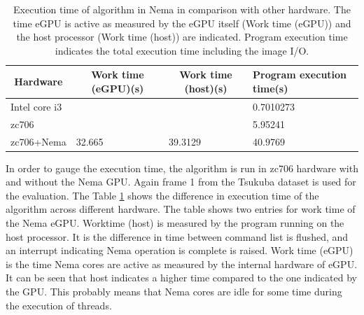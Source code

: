 \begin{table}[!htbp]
\centering
\begin{tabular}{@{}|l|l|l|l|@{}}
\toprule
\multicolumn{1}{|c|}{\textbf{Hardware}} & \multicolumn{1}{c|}{\textbf{Work time (eGPU)(s)}} & \multicolumn{1}{c|}{\textbf{Work time (host)(s)}} & \textbf{Program execution time(s)} \\ \midrule
Intel core i3                           &                                                        &                                                      & 0.7010273                    \\ \midrule
zc706                                   &                                                        &                                                      & 5.95241                      \\ \midrule
zc706+Nema                              & 32.665                                                 & 39.3129                                              & 40.9769                      \\ \bottomrule
\end{tabular}
\caption{Execution time of algorithm in Nema in comparison with other hardware. The time eGPU is active as measured by the eGPU itself (Work time (eGPU)) and the host processor (Work time (host)) are indicated. Program execution time indicates the total execution time including the image I/O.}
\label{tab:nemart}
\end{table}

In order to gauge the execution time, the algorithm is run in zc706 hardware with and without the Nema GPU. Again frame 1 from the Tsukuba dataset is used for the evaluation. The Table \ref{tab:nemart} shows the difference in execution time of the algorithm across different hardware. The table shows two entries for work time of the Nema eGPU. Worktime (host) is measured by the program running on the host processor. It is the difference in time between command list is flushed, and an interrupt indicating Nema operation is complete is raised. Work time (eGPU) is the time Nema cores are active as measured by the internal hardware of eGPU. It can be seen that host indicates a higher time compared to the one indicated by the GPU. This probably means that Nema cores are idle for some time during the execution of threads.

